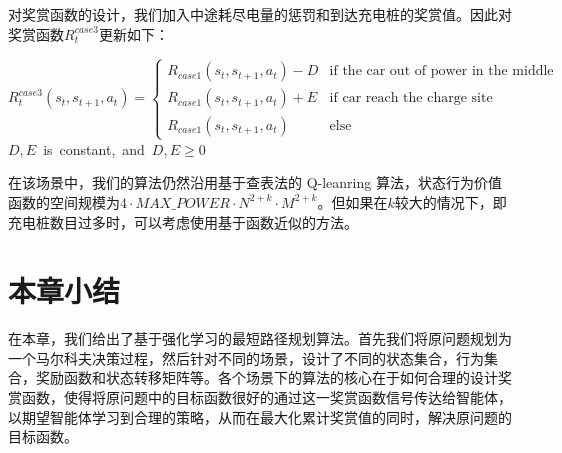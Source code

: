 \documentclass{standalone}
\begin{document}
对奖赏函数的设计，我们加入中途耗尽电量的惩罚和到达充电桩的奖赏值。因此对奖赏函数$R_t^{case3}$更新如下：
\begin{center}
    \begin{equation}
    \label{eq3reward}
    R_t^{case3}(s_t, s_{t+1}, a_t) = \begin{cases}
     R_{case1}(s_t, s_{t+1}, a_t) - D &\mbox{if the car out of power in the middle}\\
     R_{case1}(s_t, s_{t+1}, a_t) + E&\mbox{if car reach the charge site}\\
     R_{case1}(s_t, s_{t+1}, a_t)&\mbox{else}
    \end{cases}
    \end{equation}
    \mbox{$D, E$ is constant, and $D, E \geq 0$}

\end{center}
在该场景中，我们的算法仍然沿用基于查表法的 Q-leanring 算法，状态行为价值函数的空间规模为$4\cdot MAX\_POWER\cdot N^{2+k} \cdot M^{2+k}$。但如果在$k$较大的情况下，即充电桩数目过多时，可以考虑使用基于函数近似的方法。
\section{本章小结}
在本章，我们给出了基于强化学习的最短路径规划算法。首先我们将原问题规划为一个马尔科夫决策过程，然后针对不同的场景，设计了不同的状态集合，行为集合，奖励函数和状态转移矩阵等。各个场景下的算法的核心在于如何合理的设计奖赏函数，使得将原问题中的目标函数很好的通过这一奖赏函数信号传达给智能体，以期望智能体学习到合理的策略，从而在最大化累计奖赏值的同时，解决原问题的目标函数。
\end{document}
